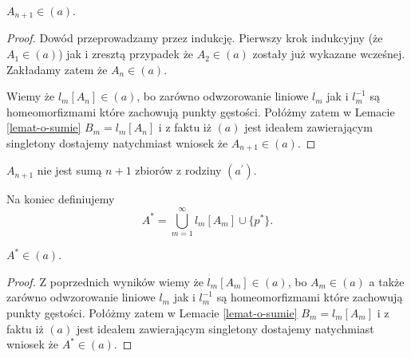 \documentclass[12pt]{amsart}
\theoremstyle{plain}
\theoremstyle{definition}
\theoremstyle{remark}
\newcommand{\aideal}{\mathit{(a)}}
\newcommand{\aidealprime}{\mathit{(a^\prime)}}
\begin{document}
 $A_{n+1} \in \aideal$.
\begin{proof}
Dowód przeprowadzamy przez indukcję. Pierwszy krok indukcyjny 
(że $A_1 \in \aideal$) jak i zresztą przypadek że
$A_2 \in \aideal$ zostały już wykazane wcześnej. 
Zakładamy zatem że $A_n \in \aideal$.

Wiemy że $l_m[A_n] \in \aideal$, bo zarówno odwzorowanie liniowe $l_m$
jak i $l_m^{-1}$ są homeomorfizmami które zachowują punkty gęstości.
Połóżmy zatem w Lemacie \ref{lemat-o-sumie} 
$B_m = l_m[A_n]$ i z faktu iż $\aideal$ jest ideałem
zawierającym singletony dostajemy natychmiast wniosek
że $A_{n+1} \in \aideal$.
\end{proof}

 $A_{n+1}$ nie jest sumą $n + 1$ zbiorów z rodziny $\aidealprime$.
  


Na koniec definiujemy 
\[ A^* = \bigcup_{m=1}^{\infty} l_m[A_m] \cup \lbrace p^* \rbrace.
\]

 $A^* \in \aideal$.
\begin{proof}
Z poprzednich wyników wiemy że $l_m[A_m] \in \aideal$, bo 
$A_m \in \aideal$ a także zarówno odwzorowanie liniowe $l_m$
jak i $l_m^{-1}$ są homeomorfizmami które zachowują punkty gęstości.
Połóżmy zatem w Lemacie \ref{lemat-o-sumie} 
$B_m = l_m[A_m]$ i z faktu iż $\aideal$ jest ideałem
zawierającym singletony dostajemy natychmiast wniosek
że $A^* \in \aideal$.
\end{proof}

\end{document}
